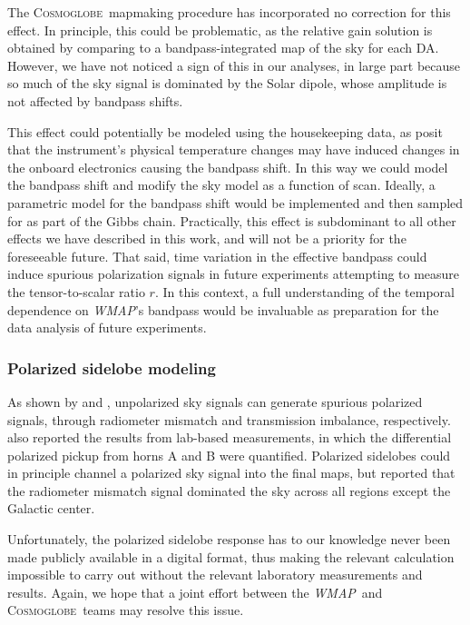 \documentclass[twocolumn]{../../common/aa}
\def\WMAP{\emph{WMAP}}
\newcommand{\cosmoglobe}{\textsc{Cosmoglobe}}
\begin{document}
The \cosmoglobe\ mapmaking procedure has incorporated no correction for this effect. In principle, this could be problematic, as the relative gain solution is obtained by comparing to a bandpass-integrated map of the sky for each DA. However, we have not noticed a sign of this in our analyses, in large part because so much of the sky signal is dominated by the Solar dipole, whose amplitude is not affected by bandpass shifts.

This effect could potentially be modeled using the housekeeping data, as \citet{bennett2012} posit that the instrument's physical temperature changes may have induced changes in the onboard electronics causing the bandpass shift. In this way we could model the bandpass shift and modify the sky model as a function of scan. Ideally, a parametric model for the bandpass shift would be implemented and then sampled for as part of the Gibbs chain. Practically, this effect is subdominant to all other effects we have described in this work, and will not be a priority for the foreseeable future. That said, time variation in the effective bandpass could induce spurious polarization signals in future experiments attempting to measure the tensor-to-scalar ratio $r$. In this context, a full understanding of the temporal dependence on \WMAP's bandpass would be invaluable as preparation for the data analysis of future experiments.

\subsubsection{Polarized sidelobe modeling}

As shown by \citet{barnes2003} and \citet{bp17}, unpolarized sky signals can generate spurious polarized signals, through radiometer mismatch and transmission imbalance, respectively. \citet{barnes2003} also reported the results from lab-based measurements, in which the differential polarized pickup from horns A and B were quantified. Polarized sidelobes could in principle channel a polarized sky signal into the final maps, but \citet{barnes2003} reported that the radiometer mismatch signal dominated the sky across all regions except the Galactic center.

Unfortunately, the polarized sidelobe response has to our knowledge never been made publicly available in a digital format, thus making the relevant calculation impossible to carry out without the relevant laboratory measurements and results. Again, we hope that a joint effort between the \WMAP\ and \cosmoglobe\ teams may resolve this issue. 
\end{document}
